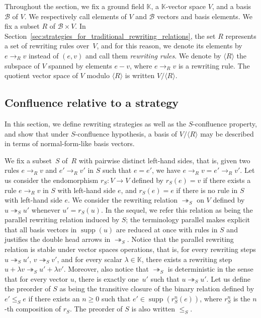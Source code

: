 \documentclass[11pt]{article}
\theoremstyle{definition}
\newcommand\basis{\mathscr{B}}
\newcommand\ordS{\leq_S}
\DeclareMathOperator{\supp}{supp}
\newcommand\K{\mathbb{K}}
\newcommand\Span[1]{\langle #1\rangle}
\newcommand\rewR{\to_R}
\newcommand\parS{\twoheadrightarrow_S}
\begin{document}
Throughout the section, we fix a ground field $\K$, a $\K$-vector space $V$, and
a basis $\basis$ of $V$. We respectively call elements of $V$ and $\basis$
vectors and basis elements. We fix a subset $R$ of $\basis\times V$. In
Section~\ref{sec:strategies_for_traditional_rewriting_relations}, the set $R$
represents a set of rewriting rules over~$V$, and for this reason, we denote its
elements by $e\rewR v$ instead of $(e,v)$ and call them \emph{rewriting
  rules}. We denote by $\Span{R}$ the subspace of $V$ spanned by elements $e-v$,
where $e\rewR v$ is a rewriting rule. The quotient vector space of $V$ modulo
$\Span{R}$ is written $V/\Span{R}$.

\subsection{Confluence relative to a strategy}
\label{sec:confluence_relative_to_a_strategy}

In this section, we define rewriting strategies as well as the $S$-confluence
property, and show that under $S$-confluence hypothesis, a basis of $V/\Span{R}$
may be described in terms of normal-form-like basis vectors.  \medskip


\medskip

We fix a subset~$S$ of~$R$ with pairwise distinct left-hand sides, that is,
given two rules $e\rewR v$ and $e'\rewR v'$ in $S$ such that $e=e'$, we have
$e\rewR v=e'\rewR v'$. Let us consider the endomorphism $r_S:V\to V$ defined by
$r_S(e)=v$ if there exists a rule $e\rewR v$ in $S$ with left-hand side $e$, and
$r_S(e)=e$ if there is no rule in $S$ with left-hand side $e$. We consider the
rewriting relation $\parS$ on $V$ defined by $u\parS u'$ whenever
$u'=r_S(u)$. In the sequel, we refer this relation as being the parallel
rewriting relation induced by $S$; the terminology parallel makes explicit that
all basis vectors in $\supp(u)$ are reduced at once with rules in $S$ and
justifies the double head arrows in $\parS$. Notice that the parallel rewriting
relation is stable under vector spaces operations, that is, for every rewriting
steps $u\parS u'$, $v\parS v'$, and for every scalar $\lambda\in\K$, there exists a
rewriting step $u+\lambda v\parS u'+\lambda v'$. Moreover, also notice that
$\parS$ is deterministic in the sense that for every vector $u$, there is
exactly one~$u'$ such that $u\parS u'$. Let us define the preorder of $S$ as
being the transitive closure of the binary relation defined by $e'\ordS e$ if
there exists an $n \geq 0$ such that $e'\in\supp(r_S^n(e))$, where
$r_S^n$ is the $n$-th composition of $r_S$. The preorder of $S$ is also
written $\ordS$.  \medskip
\end{document}
